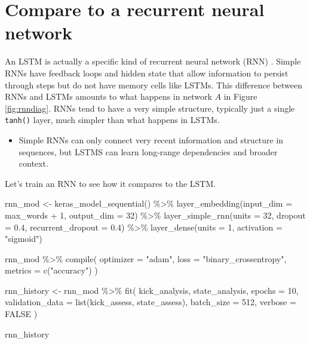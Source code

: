 \documentclass[
]{krantz}
\makeatletter
\newenvironment{Shaded}{\begin{snugshade}}{\end{snugshade}}
\newcommand{\AttributeTok}[1]{\textcolor[rgb]{0.77,0.63,0.00}{#1}}
\newcommand{\ConstantTok}[1]{\textcolor[rgb]{0.00,0.00,0.00}{#1}}
\newcommand{\DecValTok}[1]{\textcolor[rgb]{0.00,0.00,0.81}{#1}}
\newcommand{\FloatTok}[1]{\textcolor[rgb]{0.00,0.00,0.81}{#1}}
\newcommand{\FunctionTok}[1]{\textcolor[rgb]{0.00,0.00,0.00}{#1}}
\newcommand{\NormalTok}[1]{#1}
\newcommand{\OtherTok}[1]{\textcolor[rgb]{0.56,0.35,0.01}{#1}}
\newcommand{\SpecialCharTok}[1]{\textcolor[rgb]{0.00,0.00,0.00}{#1}}
\newcommand{\StringTok}[1]{\textcolor[rgb]{0.31,0.60,0.02}{#1}}
\newenvironment{kframe}{%
\medskip{}
\setlength{\fboxsep}{.8em}
 \def\at@end@of@kframe{}%
 \ifinner\ifhmode%
  \def\at@end@of@kframe{\end{minipage}}%
  \begin{minipage}{\columnwidth}%
 \fi\fi%
 \def\FrameCommand##1{\hskip\@totalleftmargin \hskip-\fboxsep
 \colorbox{shadecolor}{##1}\hskip-\fboxsep
     \hskip-\linewidth \hskip-\@totalleftmargin \hskip\columnwidth}%
 \MakeFramed {\advance\hsize-\width
   \@totalleftmargin\z@ \linewidth\hsize
   \@setminipage}}%
 {\par\unskip\endMakeFramed%
 \at@end@of@kframe}
\renewenvironment{Shaded}{\begin{kframe}}{\end{kframe}}
\newenvironment{rmdblock}[1]
  {\begin{shaded*}
  \begin{itemize}[left = -1cm, labelsep = 1cm]
  \renewcommand{\labelitemi}{
    \raisebox{-.7\height}[0pt][0pt]{
      {\setkeys{Gin}{width=3em,keepaspectratio}\texttt{[image: images/\#1]}}
    }
  }
 
  \item
  }
  {
  \end{itemize}
  \end{shaded*}
  }
\newenvironment{rmdwarning}
  {\begin{rmdblock}{warning}}
  {\end{rmdblock}}
\makeatother
\begin{document}
\hypertarget{compare-to-a-recurrent-neural-network}{%
\section{Compare to a recurrent neural network}\label{compare-to-a-recurrent-neural-network}}

An LSTM is actually a specific kind of recurrent neural network (RNN) \citep{ELMAN1990179}. Simple RNNs have feedback loops and hidden state that allow information to persist through steps but do not have memory cells like LSTMs. This difference between RNNs and LSTMs amounts to what happens in network \(A\) in Figure \ref{fig:rnndiag}. RNNs tend to have a very simple structure, typically just a single \texttt{tanh()} layer, much simpler than what happens in LSTMs.

\begin{rmdwarning}
Simple RNNs can only connect very recent information and structure in
sequences, but LSTMS can learn long-range dependencies and broader
context.
\end{rmdwarning}

Let's train an RNN to see how it compares to the LSTM.

\begin{Shaded}
\begin{Highlighting}[]
\NormalTok{rnn\_mod }\OtherTok{\textless{}{-}} \FunctionTok{keras\_model\_sequential}\NormalTok{() }\SpecialCharTok{\%\textgreater{}\%}
  \FunctionTok{layer\_embedding}\NormalTok{(}\AttributeTok{input\_dim =}\NormalTok{ max\_words }\SpecialCharTok{+} \DecValTok{1}\NormalTok{, }\AttributeTok{output\_dim =} \DecValTok{32}\NormalTok{) }\SpecialCharTok{\%\textgreater{}\%}
  \FunctionTok{layer\_simple\_rnn}\NormalTok{(}\AttributeTok{units =} \DecValTok{32}\NormalTok{, }\AttributeTok{dropout =} \FloatTok{0.4}\NormalTok{, }\AttributeTok{recurrent\_dropout =} \FloatTok{0.4}\NormalTok{) }\SpecialCharTok{\%\textgreater{}\%}
  \FunctionTok{layer\_dense}\NormalTok{(}\AttributeTok{units =} \DecValTok{1}\NormalTok{, }\AttributeTok{activation =} \StringTok{"sigmoid"}\NormalTok{)}

\NormalTok{rnn\_mod }\SpecialCharTok{\%\textgreater{}\%}
  \FunctionTok{compile}\NormalTok{(}
    \AttributeTok{optimizer =} \StringTok{"adam"}\NormalTok{,}
    \AttributeTok{loss =} \StringTok{"binary\_crossentropy"}\NormalTok{,}
    \AttributeTok{metrics =} \FunctionTok{c}\NormalTok{(}\StringTok{"accuracy"}\NormalTok{)}
\NormalTok{  )}

\NormalTok{rnn\_history }\OtherTok{\textless{}{-}}\NormalTok{ rnn\_mod }\SpecialCharTok{\%\textgreater{}\%}
  \FunctionTok{fit}\NormalTok{(}
\NormalTok{    kick\_analysis,}
\NormalTok{    state\_analysis,}
    \AttributeTok{epochs =} \DecValTok{10}\NormalTok{,}
    \AttributeTok{validation\_data =} \FunctionTok{list}\NormalTok{(kick\_assess, state\_assess),}
    \AttributeTok{batch\_size =} \DecValTok{512}\NormalTok{,}
    \AttributeTok{verbose =} \ConstantTok{FALSE}
\NormalTok{  )}

\NormalTok{rnn\_history}
\end{Highlighting}
\end{Shaded}
\end{document}
